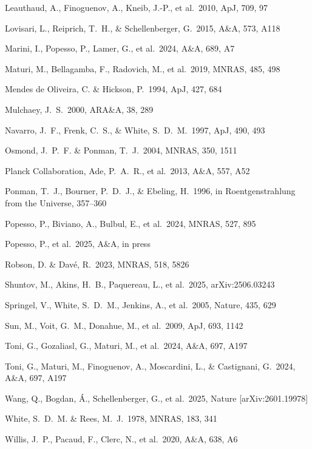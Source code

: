 \documentclass{aa}
\begin{document}
\begin{thebibliography}{}
 Leauthaud, A., Finoguenov, A., Kneib, J.-P., et al.\ 2010, ApJ, 709, 97

 Lovisari, L., Reiprich, T.~H., \& Schellenberger, G.\ 2015, A\&A, 573, A118

 Marini, I., Popesso, P., Lamer, G., et al.\ 2024, A\&A, 689, A7

 Maturi, M., Bellagamba, F., Radovich, M., et al.\ 2019, MNRAS, 485, 498

 Mendes de Oliveira, C. \& Hickson, P.\ 1994, ApJ, 427, 684

 Mulchaey, J.~S.\ 2000, ARA\&A, 38, 289

 Navarro, J.~F., Frenk, C.~S., \& White, S.~D.~M.\ 1997, ApJ, 490, 493

 Osmond, J.~P.~F. \& Ponman, T.~J.\ 2004, MNRAS, 350, 1511

 Planck Collaboration, Ade, P.~A.~R., et al.\ 2013, A\&A, 557, A52

 Ponman, T.~J., Bourner, P.~D.~J., \& Ebeling, H.\ 1996, in Roentgenstrahlung from the Universe, 357--360

 Popesso, P., Biviano, A., Bulbul, E., et al.\ 2024, MNRAS, 527, 895

 Popesso, P., et al.\ 2025, A\&A, in press

 Robson, D. \& Dav\'e, R.\ 2023, MNRAS, 518, 5826

 Shuntov, M., Akins, H.~B., Paquereau, L., et al.\ 2025, arXiv:2506.03243

 Springel, V., White, S.~D.~M., Jenkins, A., et al.\ 2005, Nature, 435, 629

 Sun, M., Voit, G.~M., Donahue, M., et al.\ 2009, ApJ, 693, 1142

 Toni, G., Gozaliasl, G., Maturi, M., et al.\ 2024, A\&A, 697, A197

 Toni, G., Maturi, M., Finoguenov, A., Moscardini, L., \& Castignani, G.\ 2024, A\&A, 697, A197

 Wang, Q., Bogdan, \'A., Schellenberger, G., et al.\ 2025, Nature [arXiv:2601.19978]

 White, S.~D.~M. \& Rees, M.~J.\ 1978, MNRAS, 183, 341

 Willis, J.~P., Pacaud, F., Clerc, N., et al.\ 2020, A\&A, 638, A6

\end{thebibliography}
\end{document}
